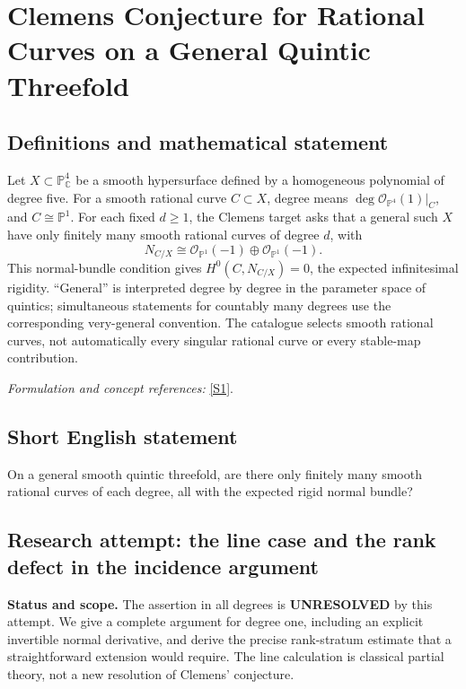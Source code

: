 \documentclass[11pt]{article}
\begin{document}
\section*{\texorpdfstring{Clemens Conjecture for Rational Curves on a General Quintic Threefold}{Clemens Conjecture for Rational Curves on a General Quintic Threefold}}\label{399}
\subsection{Definitions and mathematical statement}
Let $X\subset{\mathbb{P}}^4_{{\mathbb{C}}}$ be a smooth hypersurface defined by a homogeneous polynomial of degree five. For a smooth rational curve $C\subset X$, degree means $\deg\mathcal O_{{\mathbb{P}}^4}(1)|_C$, and $C\cong{\mathbb{P}}^1$. For each fixed $d\ge1$, the Clemens target asks that a general such $X$ have only finitely many smooth rational curves of degree $d$, with
\[
 N_{C/X}\cong\mathcal O_{{\mathbb{P}}^1}(-1)\oplus\mathcal O_{{\mathbb{P}}^1}(-1).
\]
This normal-bundle condition gives $H^0(C,N_{C/X})=0$, the expected infinitesimal rigidity. ``General'' is interpreted degree by degree in the parameter space of quintics; simultaneous statements for countably many degrees use the corresponding very-general convention. The catalogue selects smooth rational curves, not automatically every singular rational curve or every stable-map contribution.
\par\smallskip\textit{Formulation and concept references:} \href{https://encyclopediaofmath.org/wiki/Clemens%27_conjecture}{[S1]}.

\subsection{Short English statement}
On a general smooth quintic threefold, are there only finitely many smooth rational curves of each degree, all with the expected rigid normal bundle?
\subsection{Research attempt: the line case and the rank defect in the incidence argument}
\textbf{Status and scope.} The assertion in all degrees is \textbf{UNRESOLVED} by this attempt. We give a complete argument for degree one, including an explicit invertible normal derivative, and derive the precise rank-stratum estimate that a straightforward extension would require. The line calculation is classical partial theory, not a new resolution of Clemens' conjecture.
\end{document}
